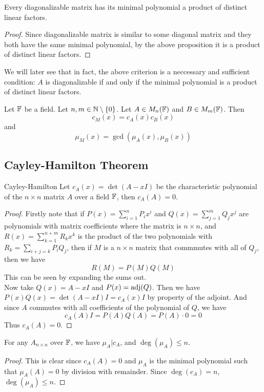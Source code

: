 \documentclass[a4paper]{article}
\begin{document}
\begin{crl}{}{} Every diagonalizable matrix has its minimal polynomial a product of distinct linear factors. 
\begin{proof} Since diagonalizable matrix is similar to some diagonal matrix and they both have the same minimal polynomial, by the above proposition it is a product of distinct linear factors. 
\end{proof}
\end{crl}

We will later see that in fact, the above criterion is a neccessary and sufficient condition: $A$ is diagonalizable if and only if the minimal polynomial is a product of distinct linear factors. 

\begin{lmm}{}{} Let $\mathbb{F}$ be a field. Let $n,m\in\mathbb{N}\setminus\{0\}$. Let $A\in M_n(\mathbb{F})$ and $B\in M_m(\mathbb{F})$. Then $$c_M(x)=c_A(x)c_B(x)$$ and $$\mu_M(x)=\gcd(\mu_A(x),\mu_B(x))$$
\end{lmm}

\subsection{Cayley-Hamilton Theorem}
\begin{thm}{Cayley-Hamilton}{} Let $c_A(x)=\det(A-xI)$ be the characteristic polynomial of the $n\times n$ matrix $A$ over a field $\mathbb{F}$, then $c_A(A)=0$. 
\begin{proof} Firstly note that if $P(x)=\sum_{i=1}^nP_ix^i$ and $Q(x)=\sum_{j=1}^mQ_jx^j$ are polynomials with matrix coefficients where the matrix is $n\times n$, and $R(x)=\sum_{k=1}^{n+m}R_kx^k$ is the product of the two polynomials with $R_k=\sum_{i+j=k}P_iQ_j$, then if $M$ is a $n\times n$ matrix that commmutes with all of $Q_j$, then we have $$R(M)=P(M)Q(M)$$
This can be seen by expanding the sums out. \\
Now take $Q(x)=A-xI$ and $P(x)=\operatorname{adj}(Q)$. Then we have $P(x)Q(x)=\det(A-xI)I=c_A(x)I$ by property of the adjoint. And since $A$ commutes with all coefficients of the polynomial of $Q$, we have $$c_A(A)I=P(A)Q(A)=P(A)\cdot 0=0$$ Thus $c_A(A)=0$. 
\end{proof}
\end{thm}

\begin{crl}{}{} For any $A_{n\times n}$ over $\mathbb{F}$, we have $\mu_A|c_A$, and $\deg(\mu_A)\leq n$. 
\begin{proof}
This is clear since $c_A(A)=0$ and $\mu_A$ is the minimal polynomial such that $\mu_A(A)=0$ by division with remainder. Since $\deg(c_A)=n$, $\deg(\mu_A)\leq n$. 
\end{proof}
\end{crl}
\end{document}
